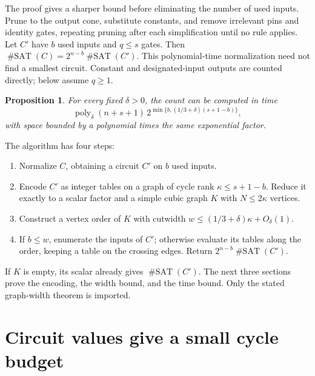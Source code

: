 \documentclass[11pt]{article}
\newtheorem{proposition}[theorem]{Proposition}
\newcommand{\poly}{\operatorname{poly}}
\newcommand{\satcount}{\operatorname{\#SAT}}
\begin{document}
The proof gives a sharper bound before eliminating the number of
used inputs. Prune to the output cone, substitute constants, and
remove irrelevant pins and identity gates, repeating pruning after
each simplification until no rule applies. Let $C'$ have $b$ used
inputs and $q\le s$ gates. Then
$\satcount(C)=2^{n-b}\satcount(C')$. This polynomial-time
normalization need not find a smallest circuit. Constant and
designated-input outputs are counted directly; below assume $q\ge1$.

\begin{proposition}\label{prop:sensitive}
For every fixed $\delta>0$, the count can be computed in time
\begin{equation}\label{eq:sensitive}
 \poly_\delta(n+s+1)\,
 2^{\min\{b,(1/3+\delta)(s+1-b)\}},
\end{equation}
with space bounded by a polynomial times the same exponential factor.
\end{proposition}

\begin{samepage}
The algorithm has four steps:
\begin{enumerate}
 \item Normalize $C$, obtaining a circuit $C'$ on $b$ used inputs.
 \item Encode $C'$ as integer tables on a graph of cycle rank
       $\kappa\le s+1-b$. Reduce it exactly to a scalar factor and
       a simple cubic graph $K$ with $N\le2\kappa$ vertices.
 \item Construct a vertex order of $K$ with cutwidth
       $w\le(1/3+\delta)\kappa+O_\delta(1)$.
 \item If $b\le w$, enumerate the inputs of $C'$; otherwise evaluate
       its tables along the order, keeping a table on the crossing
       edges. Return $2^{n-b}\satcount(C')$.
\end{enumerate}
\end{samepage}
If $K$ is empty, its scalar already gives $\satcount(C')$.
The next three sections prove the encoding, the width bound, and the
time bound. Only the stated graph-width theorem is imported.

\section{Circuit values give a small cycle budget}
\end{document}
